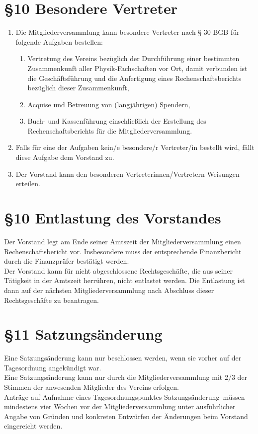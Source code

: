\documentclass[ngerman]{article}
\begin{document}
\section*{§10 Besondere Vertreter}
\begin{enumerate}
 \item Die Mitgliederversammlung kann besondere Vertreter nach § 30 BGB für folgende Aufgaben bestellen:
 \begin{enumerate}
  \item Vertretung des Vereins bezüglich der Durchführung einer bestimmten Zusammenkunft aller Physik-Fachschaften vor Ort,
        damit verbunden ist die Geschäftsführung und die Anfertigung eines Rechenschaftsberichts bezüglich dieser Zusammenkunft,
  \item Acquise und Betreuung von (langjährigen) Spendern,
  \item Buch- und Kassenführung einschließlich der Erstellung des Rechenschaftsberichts für die Mitgliederversammlung.
 \end{enumerate}
 \item Falls für eine der Aufgaben kein/e besondere/r Vertreter/in bestellt wird, fällt diese Aufgabe dem Vorstand zu.
 \item Der Vorstand kann den besonderen Vertreterinnen/Vertretern Weisungen erteilen.
\end{enumerate}


\section*{§10 Entlastung des Vorstandes}
Der Vorstand legt am Ende seiner Amtszeit der Mitgliederversammlung einen Rechenschaftsbericht vor. Insbesondere muss der entsprechende Finanzbericht durch die Finanzprüfer bestätigt werden.\\
Der Vorstand kann für nicht abgeschlossene Rechtsgeschäfte, die aus seiner Tätigkeit in der Amtszeit herrühren, nicht entlastet werden. Die Entlastung ist dann auf der nächsten Mitgliederversammlung nach Abschluss dieser Rechtsgeschäfte zu beantragen.


\section*{§11 Satzungsänderung}
Eine Satzungsänderung kann nur beschlossen werden, wenn sie vorher auf der Tagesordnung angekündigt war.\\
Eine Satzungsänderung kann nur durch die Mitgliederversammlung mit 2/3 der Stimmen der anwesenden Mitglieder des Vereins erfolgen.\\
Anträge auf Aufnahme eines Tagesordnungspunktes \glqq Satzungsänderung\grqq\ müssen mindestens vier Wochen vor der Mitgliederversammlung unter ausführlicher Angabe von Gründen und konkreten Entwürfen der Änderungen beim Vorstand eingereicht werden.
\end{document}
